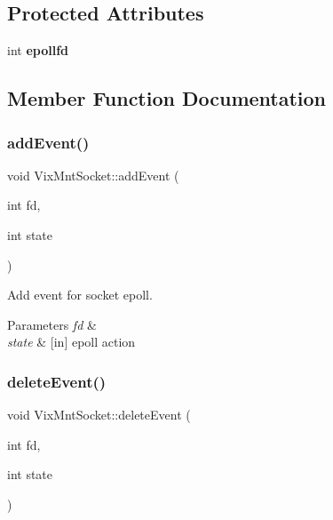 \subsection*{Protected Attributes}
\begin{DoxyCompactItemize}
\item 
\hypertarget{class_vix_mnt_socket_a3b70b47638e830e5f2caa73e86386074}{}\label{class_vix_mnt_socket_a3b70b47638e830e5f2caa73e86386074} 
int {\bfseries epollfd}
\end{DoxyCompactItemize}


\subsection{Member Function Documentation}
\hypertarget{class_vix_mnt_socket_a6489a8065654dc69cca7dd71348211af}{}\label{class_vix_mnt_socket_a6489a8065654dc69cca7dd71348211af} 
\subsubsection{\texorpdfstring{add\+Event()}{addEvent()}}
{\ttfamily void Vix\+Mnt\+Socket\+::add\+Event (\begin{DoxyParamCaption}\item[{int}]{fd,  }\item[{int}]{state }\end{DoxyParamCaption})\hspace{0.3cm}{\ttfamily [protected]}}



Add event for socket epoll. 


\begin{DoxyParams}{Parameters}
{\em fd} & \\
\hline
{\em state} & \mbox{[}in\mbox{]} epoll action \\
\hline
\end{DoxyParams}
\hypertarget{class_vix_mnt_socket_a08b1d3d1dbf17ef8d2a20dc1bcfd2596}{}\label{class_vix_mnt_socket_a08b1d3d1dbf17ef8d2a20dc1bcfd2596} 
\subsubsection{\texorpdfstring{delete\+Event()}{deleteEvent()}}
{\ttfamily void Vix\+Mnt\+Socket\+::delete\+Event (\begin{DoxyParamCaption}\item[{int}]{fd,  }\item[{int}]{state }\end{DoxyParamCaption})\hspace{0.3cm}{\ttfamily [protected]}}




